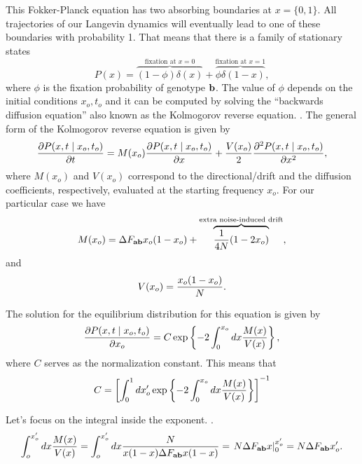 This Fokker-Planck equation has two absorbing boundaries at $x = \{0, 1 \}$. All
trajectories of our Langevin dynamics will eventually lead to one of these
boundaries with probability 1. That means that there is a family of stationary
states
\begin{equation}
  P(x) = \overbrace{(1 - \phi) \delta(x)}^{\text{fixation at }x=0} +
         \overbrace{\phi \delta(1 - x)}^{\text{fixation at }x=1},
\end{equation}
where $\phi$ is the fixation probability of genotype $\mathbf{b}$. The value of
$\phi$ depends on the initial conditions $x_o, t_o$ and it can be computed by
solving the ``backwards diffusion equation'' also known as the Kolmogorov
reverse equation. . The general form of the Kolmogorov reverse
equation is given by
\begin{equation}
  {\partial P(x, t \mid x_o, t_o) \over \partial t} =
  M(x_o) {\partial P(x, t \mid x_o, t_o) \over \partial x} +
  {V(x_o) \over 2} {\partial^2 P(x, t \mid x_o, t_o) \over \partial x^2},
\end{equation}
where $M(x_o)$ and $V(x_o)$ correspond to the directional/drift and the
diffusion coefficients, respectively, evaluated at the starting frequency $x_o$.
For our particular case we have
\begin{equation}
  M(x_o) = \Delta F_{\mathbf{ab}} x_o (1 - x_o) + \overbrace{{1 \over 4N} (1 - 2x_o)}^
  {\text{extra noise-induced drift}},
\end{equation}
and
\begin{equation}
  V(x_o) = {x_o (1 - x_o) \over N}.
\end{equation}

The solution for the equilibrium distribution for this equation is given by
\begin{equation}
  {\partial P(x, t \mid x_o, t_o) \over \partial x_o} =
  C \exp \left\{ -2 \int_0^{x_o} dx {M(x) \over V(x)} \right\},
\end{equation}
where $C$ serves as the normalization constant. This means that
\begin{equation}
  C = \left[ \int_0^1 dx_o'
      \exp \left\{ -2 \int_0^{x_o} dx {M(x) \over V(x)} \right\} \right]^{-1}
\end{equation}

Let's focus on the integral inside the exponent.
.
\begin{equation}
  \int_o^{x_o'} dx {M(x) \over V(x)} =
  \int_o^{x_o'} dx {N \over x (1 - x) \Delta F_{\mathbf{ab}} x(1 - x)} =
  \left. N \Delta F_{\mathbf{ab}} x \right\rvert_0^{x_o'} = N \Delta F_{\mathbf{ab}} x_o'.
\end{equation}

